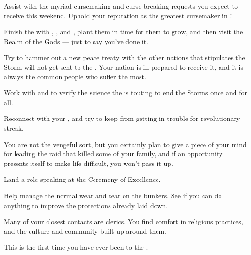 \documentclass[char]{GL2020}
\begin{document}
\begin{itemz}
    \item Assist with the myriad cursemaking and curse breaking requests you expect to receive this weekend. Uphold your reputation as the greatest cursemaker in \pEarth{}!
    \item Finish the \iBeansNB{} with \cFlowPriest{}, \cAssistantScientist{}, and \cAmbition{}, plant them in time for them to grow, and then visit the Realm of the Gods — just to say you've done it.
    \item Try to hammer out a new peace treaty with the other nations that stipulates the Storm will not get sent to the \pFarm{}. Your nation is ill prepared to receive it, and it is always the common people who suffer the most.
    \item Work with \cHedonist{} and \cAssistantScientist{} to verify the science the \pTech{} is touting to end the Storms once and for all.
    \item Reconnect with your \cChupLeader{\nibling} \cChupLeader{}, and try to keep \cChupLeader{\them} from getting in trouble for \cChupLeader{\their} revolutionary streak.
    \item You are not the vengeful sort, but you certainly plan to give \cJuniorStatesman{} a piece of your mind for leading the raid that killed some of your family, and if an opportunity presents itself to make \cJuniorStatesman{\their} life difficult, you won't pass it up.
    \item Land a role speaking at the Ceremony of Excellence.
    \item Help \cBunker{} manage the normal wear and tear on the bunkers. See if you can do anything to improve the protections already laid down.
\end{itemz}

\begin{itemz}[Notes]
    \item Many of your closest contacts are clerics. You find comfort in religious practices, and the culture and community built up around them.
    \item This is the first time you have ever been to the \pSchool{}.
\end{itemz}
\end{document}
